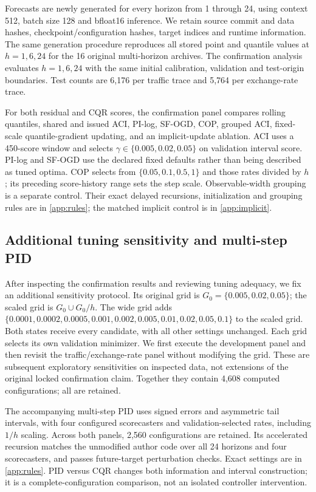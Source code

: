 \documentclass[preprint,11pt]{elsarticle}
\begin{document}
Forecasts are newly generated for every horizon from 1 through 24, using context 512,
batch size 128 and bfloat16 inference. We retain source commit and data hashes,
checkpoint/configuration hashes, target indices and runtime information. The same
generation procedure reproduces all stored point and quantile values at $h=1,6,24$
for the 16 original multi-horizon archives. The confirmation analysis evaluates
$h=1,6,24$ with the same initial calibration, validation and test-origin boundaries.
Test counts are 6,176 per traffic trace and 5,764 per exchange-rate trace.

For both residual and CQR scores, the confirmation panel compares rolling quantiles,
shared and issued ACI, PI-log, SF-OGD, COP, grouped ACI, fixed-scale quantile-gradient
updating, and an implicit-update ablation. ACI uses a 450-score window and selects
$\gamma\in\{0.005,0.02,0.05\}$ on validation interval score. PI-log and SF-OGD use
the declared fixed defaults rather than being described as tuned optima.
COP selects from $\{0.05,0.1,0.5,1\}$ and those rates divided by $h$; its preceding
score-history range sets the step scale. Observable-width grouping is a separate
control. Their exact delayed recursions, initialization and grouping rules are in
\ref{app:rules}; the matched implicit control is in \ref{app:implicit}.

\subsection{Additional tuning sensitivity and multi-step PID}\label{sec:v8design}
After inspecting the confirmation results and reviewing tuning adequacy, we fix an
additional sensitivity protocol. Its original grid is $G_0=\{0.005,0.02,0.05\}$;
the scaled grid is $G_0\cup G_0/h$. The wide grid adds
$\{0.0001,0.0002,0.0005,0.001,0.002,0.005,0.01,0.02,0.05,0.1\}$ to the scaled grid.
Both states receive every candidate, with all other settings unchanged. Each grid
selects its own validation minimizer. We first execute the development panel and then
revisit the traffic/exchange-rate panel without modifying the grid. These are subsequent
exploratory sensitivities on inspected data, not extensions of the original locked
confirmation claim. Together they contain 4,608 computed configurations; all are retained.

The accompanying multi-step PID uses signed errors and asymmetric tail intervals,
with four configured scorecasters and validation-selected rates, including $1/h$
scaling. Across both panels, 2,560 configurations are retained. Its accelerated
recursion matches the unmodified author code over all 24 horizons and four
scorecasters, and passes future-target perturbation checks. Exact settings are in
\ref{app:rules}. PID versus CQR changes both information and interval construction;
it is a complete-configuration comparison, not an isolated controller intervention.
\end{document}
